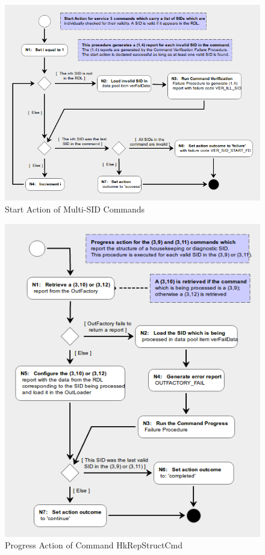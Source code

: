 \documentclass[a4paper,10pt]{article}
\begin{document}
\begin{figure}[H]
 \centering
 \includegraphics[scale=0.55,keepaspectratio=true]{CrPsCmd3SidStart.png}
 \caption{Start Action of Multi-SID Commands}
 \label{fig:Cmd3SidStart}
\end{figure}

\begin{figure}[H]
 \centering
 \includegraphics[scale=0.55,keepaspectratio=true]{CrPsCmd3s9Prgr.png}
 \caption{Progress Action of Command HkRepStructCmd}
 \label{fig:Cmd3s9Prgr}
\end{figure}
\end{document}
